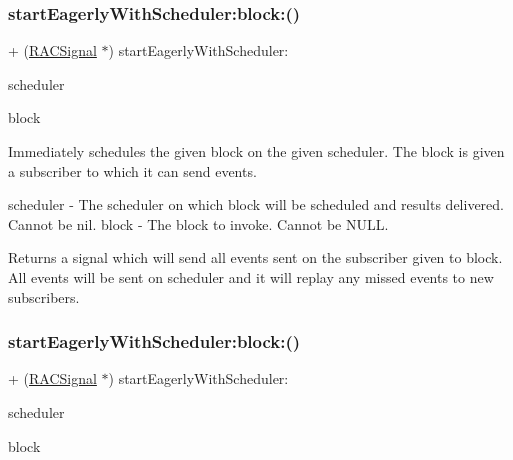 \subsubsection{\texorpdfstring{start\+Eagerly\+With\+Scheduler\+:block\+:()}{startEagerlyWithScheduler:block:()}\hspace{0.1cm}{\footnotesize\ttfamily [1/3]}}
{\footnotesize\ttfamily + (\mbox{\hyperlink{interface_r_a_c_signal}{R\+A\+C\+Signal}} $\ast$) start\+Eagerly\+With\+Scheduler\+: \begin{DoxyParamCaption}\item[{(\mbox{\hyperlink{interface_r_a_c_scheduler}{R\+A\+C\+Scheduler}} $\ast$)}]{scheduler }\item[{block:(void($^\wedge$)(id$<$ \mbox{\hyperlink{interface_r_a_c_subscriber}{R\+A\+C\+Subscriber}} $>$ subscriber))}]{block }\end{DoxyParamCaption}}

Immediately schedules the given block on the given scheduler. The block is given a subscriber to which it can send events.

scheduler -\/ The scheduler on which {\ttfamily block} will be scheduled and results delivered. Cannot be nil. block -\/ The block to invoke. Cannot be N\+U\+LL.

Returns a signal which will send all events sent on the subscriber given to {\ttfamily block}. All events will be sent on {\ttfamily scheduler} and it will replay any missed events to new subscribers. \mbox{\label{interface_r_a_c_signal_a6bee49e8a8ee2f41bcec31bb86948b37}} 
\subsubsection{\texorpdfstring{start\+Eagerly\+With\+Scheduler\+:block\+:()}{startEagerlyWithScheduler:block:()}\hspace{0.1cm}{\footnotesize\ttfamily [2/3]}}
{\footnotesize\ttfamily + (\mbox{\hyperlink{interface_r_a_c_signal}{R\+A\+C\+Signal}} $\ast$) start\+Eagerly\+With\+Scheduler\+: \begin{DoxyParamCaption}\item[{(\mbox{\hyperlink{interface_r_a_c_scheduler}{R\+A\+C\+Scheduler}} $\ast$)}]{scheduler }\item[{block:(void($^\wedge$)(id$<$ \mbox{\hyperlink{interface_r_a_c_subscriber}{R\+A\+C\+Subscriber}} $>$ subscriber))}]{block }\end{DoxyParamCaption}}

